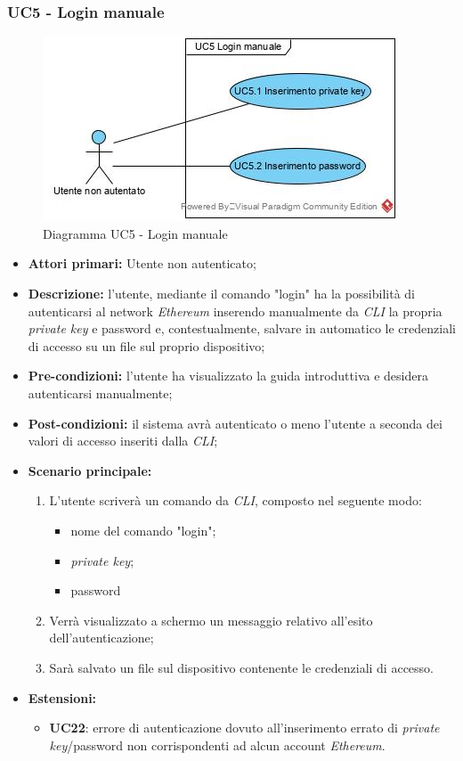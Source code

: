 \subsubsection{UC5 - Login manuale}
\begin{figure}[h]
	\centering
	\includegraphics[width=0.8\linewidth]{res/img/UC5.jpg}
	\caption{Diagramma UC5 - Login manuale}
\end{figure}
\begin{itemize}
	\item \textbf{Attori primari:} Utente non autenticato;
	\item \textbf{Descrizione:} l'utente, mediante il comando "login" ha la possibilità di autenticarsi al network \textit{Ethereum\glo} inserendo manualmente da \textit{CLI\glo} la propria \textit{private key\glos} e password e, contestualmente, salvare in automatico le credenziali di accesso su un file sul proprio dispositivo;
	\item \textbf{Pre-condizioni:} l'utente ha visualizzato la guida introduttiva e desidera autenticarsi manualmente;
	\item \textbf{Post-condizioni:} il sistema avrà autenticato o meno l'utente a seconda dei valori di accesso inseriti dalla \textit{CLI\glos};
	\item \textbf{Scenario principale:}
	\begin{enumerate}
		\item L'utente scriverà un comando da \textit{CLI\glos}, composto nel seguente modo:
		\begin{itemize}
			\item nome del comando "login";
			\item \textit{private key\glos};
			\item password
		\end{itemize}
		\item Verrà visualizzato a schermo un messaggio relativo all'esito dell'autenticazione;
		\item Sarà salvato un file sul dispositivo contenente le credenziali di accesso.
	\end{enumerate}
	\item \textbf{Estensioni:} 
	\begin{itemize}
		\item \textbf{UC22}: errore di autenticazione dovuto all'inserimento errato di \textit{private key\glos}/password non corrispondenti ad alcun account \textit{Ethereum\glos}.
	\end{itemize}
\end{itemize}
